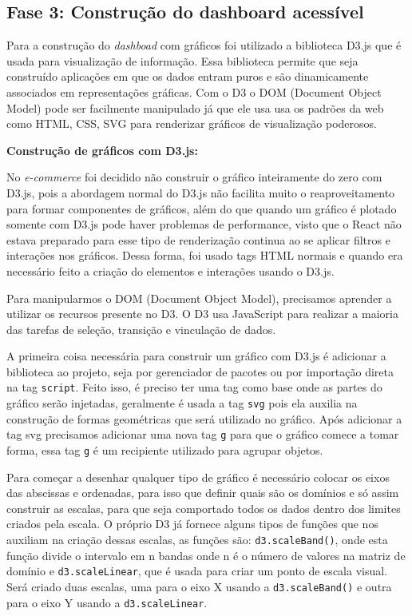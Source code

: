 \subsection{Fase 3: Construção do dashboard acessível}
{Para a construção do \textit{dashboad} com gráficos foi utilizado a biblioteca D3.js que é usada para visualização de informação. Essa biblioteca permite que seja construído aplicações em que os dados entram puros e são dinamicamente associados em representações gráficas. Com o D3 o DOM (Document Object Model) pode ser facilmente manipulado já que ele usa usa os padrões da web como HTML, CSS, SVG para renderizar gráficos de visualização poderosos.}

{\textbf{Construção de gráficos com D3.js:}

No \textit{e-commerce} foi decidido não construir o gráfico inteiramente do zero com D3.js, pois a abordagem normal do D3.js não facilita muito o reaproveitamento para formar componentes de gráficos, além do que quando um gráfico é plotado somente com D3.js pode haver problemas de performance, visto que o React não estava preparado para esse tipo de renderização continua ao se aplicar filtros e interações nos gráficos. Dessa forma, foi usado tags HTML normais e quando era necessário feito a criação do elementos e interações usando o D3.js.

Para manipularmos o DOM (Document Object Model), precisamos aprender a utilizar os recursos presente no D3. O D3 usa JavaScript para realizar a maioria das tarefas de seleção, transição e vinculação de dados.

A primeira coisa necessária para construir um gráfico com D3.js é adicionar a biblioteca ao projeto, seja por gerenciador de pacotes ou por importação direta na tag \lstinline{script}. Feito isso, é preciso ter uma tag como base onde as partes do gráfico serão injetadas, geralmente é usada a tag \lstinline{svg} pois ela auxilia na construção de formas geométricas que será utilizado no gráfico. Após adicionar a tag svg precisamos adicionar uma nova tag \lstinline{g} para que o gráfico comece a tomar forma, essa tag \lstinline{g} é um recipiente utilizado para agrupar objetos.

Para começar a desenhar qualquer tipo de gráfico é necessário colocar os eixos das abscissas e ordenadas, para isso que definir quais são os domínios e só assim construir as escalas, para que seja comportado todos os dados dentro dos limites criados pela escala. O próprio D3 já fornece alguns tipos de funções que nos auxiliam na criação dessas escalas, as funções são: \lstinline{d3.scaleBand()}, onde esta função divide o intervalo em n bandas onde n é o número de valores na matriz de domínio e \lstinline{d3.scaleLinear}, que é usada para criar um ponto de escala visual. Será criado duas escalas, uma para o eixo X usando a \lstinline{d3.scaleBand()} e outra para o eixo Y usando a \lstinline{d3.scaleLinear}.

}
